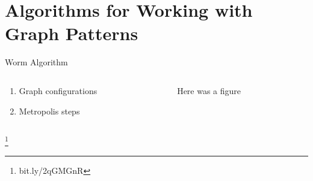 \documentclass[10pt]{beamer}
\newcommand\blfootnote[1]{%
  \begingroup
  \renewcommand\thefootnote{}\footnote{#1}%
  \addtocounter{footnote}{-1}%
  \endgroup
}
\begin{document}
\section{Algorithms for Working with Graph Patterns}

\begin{frame}{Worm Algorithm}
    \begin{columns}[c]
        \begin{column}{0.4\textwidth}
            \begin{enumerate}[$\bullet$]
                \item Graph configurations
                \item Metropolis steps
            \end{enumerate}
        \end{column}
        \begin{column}{0.7\textwidth}  %
                    Here was a figure
        \end{column}
    \end{columns}
    \blfootnote{bit.ly/2qGMGnR}
\end{frame}
\end{document}
